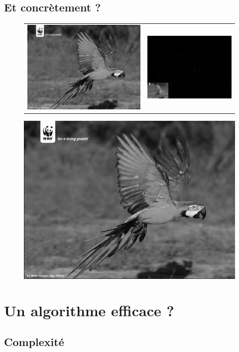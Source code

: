 \documentclass[10pt]{beamer}
\begin{document}
    \subsection{Et concr\`{e}tement ?}

      \begin{frame}
	\begin{figure}[H]
	  \centering
	  \begin{tabular}{cc}
	    \includegraphics[width = 0.4 \linewidth]{ara_orig.eps} &
	    \includegraphics[width = 0.4 \linewidth]{ara_wt_V1.eps} 
	  \end{tabular}
	  \includegraphics[width = 0.4 \linewidth]{ara_decomp.eps}
	\end{figure}   

      \end{frame}
      
  \section{Un algorithme efficace ?}
  
    \subsection{Complexit\'{e}}
      
\end{document}
